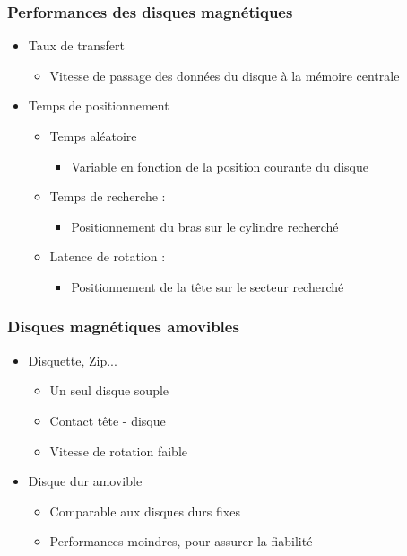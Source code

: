 \begin{frame}
\frametitle{Performances des disques magnétiques}
\begin{itemize}
\item Taux de transfert
\begin{itemize}
\item Vitesse de passage des données du disque à la mémoire centrale
\end{itemize}
\item Temps de positionnement
\begin{itemize}
\item Temps aléatoire
\begin{itemize}
\item Variable en fonction de la position courante du disque
\end{itemize}

\item Temps de recherche : 
\begin{itemize}
\item Positionnement du bras sur le cylindre recherché
\end{itemize}
\item Latence de rotation :
\begin{itemize}
\item Positionnement de la tête sur le secteur recherché
\end{itemize}
\end{itemize}
\end{itemize}
\end{frame}

\begin{frame}
\frametitle{Disques magnétiques amovibles}
\begin{itemize}
\item Disquette, Zip...
\begin{itemize}
\item Un seul disque souple
\item Contact tête - disque
\item Vitesse de rotation faible
\end{itemize}
\item Disque dur amovible
\begin{itemize}
\item Comparable aux disques durs fixes
\item Performances moindres, pour assurer la fiabilité
\end{itemize}
\end{itemize}
\end{frame}


